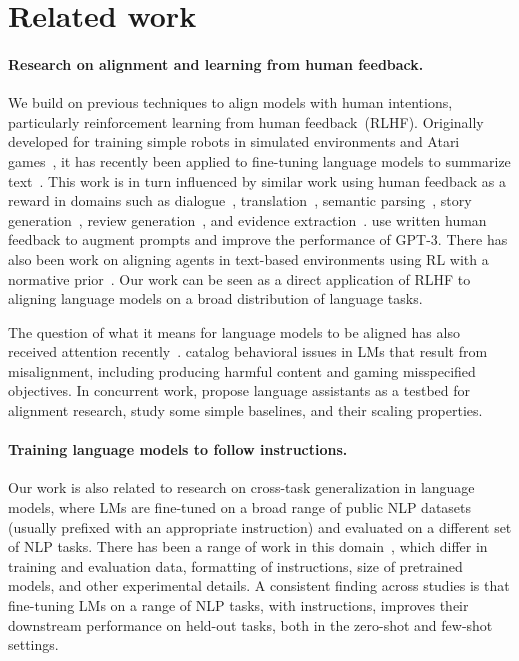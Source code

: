 \documentclass{article}
\begin{document}
\section{Related work}
\label{sec:related-work}

\paragraph{Research on alignment and learning from human feedback.} We build on previous techniques to align models with human intentions, particularly reinforcement learning from human feedback~(RLHF). Originally developed for training simple robots in simulated environments and Atari games~\citep{christiano2017deep,ibarz2018reward}, it has recently been applied to fine-tuning language models to summarize text~\citep{ziegler2019fine,stiennon2020learning,bohm2019better,wu2021recursively}. This work is in turn influenced by similar work using human feedback as a reward in domains such as dialogue~\citep{jaques2019way,yi2019towards,hancock2019learning}, translation~\citep{kreutzer2018can,bahdanau2016actor}, semantic parsing~\citep{lawrence2018improving}, story generation~\citep{zhou2020learning}, review generation~\citep{cho2018towards}, and evidence extraction~\citep{perez2019finding}.  \citet{madaan2022memory} use written human feedback to augment prompts and improve the performance of GPT-3. There has also been work on aligning agents in text-based environments using RL with a normative prior~\citep{nahian2021training}. Our work can be seen as a direct application of RLHF to aligning language models on a broad distribution of language tasks. 

The question of what it means for language models to be aligned has also received attention recently~\citep{gabriel2020artificial}. \citet{kenton2021alignment} catalog behavioral issues in LMs that result from misalignment, including producing harmful content and gaming misspecified objectives. In concurrent work, \citet{askell2021general} propose language assistants as a testbed for alignment research, study some simple baselines, and their scaling properties.

\paragraph{Training language models to follow instructions.} Our work is also related to research on cross-task generalization in language models, where LMs are fine-tuned on a broad range of public NLP datasets (usually prefixed with an appropriate instruction) and evaluated on a different set of NLP tasks. There has been a range of work in this domain~\citep{yi2019towards,mishra2021cross,wei2021finetuned,khashabi2020unifiedqa,sanh2021multitask,aribandi2021ext5}, which differ in training and evaluation data, formatting of instructions, size of pretrained models, and other experimental details. A consistent finding across studies is that fine-tuning LMs on a range of NLP tasks, with instructions, improves their downstream performance on held-out tasks, both in the zero-shot and few-shot settings. 
\end{document}
